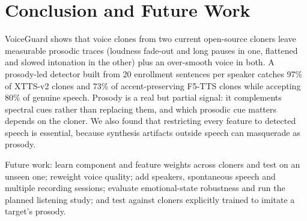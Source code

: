 \documentclass[11pt,a4paper]{article}
\begin{document}
\section{Conclusion and Future Work}
VoiceGuard shows that voice clones from two current open-source cloners leave measurable prosodic traces (loudness fade-out and long pauses in one, flattened and slowed intonation in the other) plus an over-smooth voice in both. A prosody-led detector built from 20 enrollment sentences per speaker catches 97\% of XTTS-v2 clones and 73\% of accent-preserving F5-TTS clones while accepting 80\% of genuine speech. Prosody is a real but partial signal: it complements spectral cues rather than replacing them, and which prosodic cue matters depends on the cloner. We also found that restricting every feature to detected speech is essential, because synthesis artifacts outside speech can masquerade as prosody.

Future work: learn component and feature weights across cloners and test on an unseen one; reweight voice quality; add speakers, spontaneous speech and multiple recording sessions; evaluate emotional-state robustness and run the planned listening study; and test against cloners explicitly trained to imitate a target's prosody.
\end{document}
